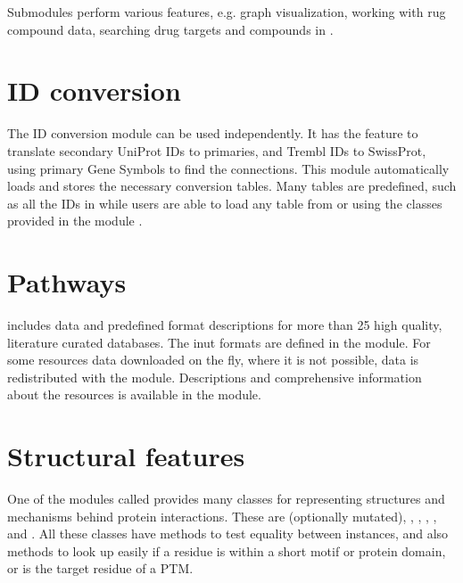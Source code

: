 \documentclass[letterpaper,10pt,english]{sphinxmanual}
\begin{document}
Submodules perform various features, e.g. graph visualization, working with
rug compound data, searching drug targets and compounds in .


\section{ID conversion}
\label{\detokenize{index:id-conversion}}
The ID conversion module  can be used independently. It has the
feature to translate secondary UniProt IDs to primaries, and Trembl IDs to
SwissProt, using primary Gene Symbols to find the connections. This module
automatically loads and stores the necessary conversion tables. Many tables
are predefined, such as all the IDs in  while
users are able to load any table from  or  using the classes
provided in the module .


\section{Pathways}
\label{\detokenize{index:pathways}}
 includes data and predefined format descriptions for more than 25
high quality, literature curated databases. The inut formats are defined in
the  module. For some resources data downloaded on the fly,
where it is not possible, data is redistributed with the module. Descriptions
and comprehensive information about the resources is available in the
 module.


\section{Structural features}
\label{\detokenize{index:structural-features}}
One of the modules called  provides many classes for representing
structures and mechanisms behind protein interactions. These are 
(optionally mutated), , , , ,
 and . All these classes have 
methods to test equality between instances, and also 
methods to look up easily if a residue is within a short motif or protein
domain, or is the target residue of a PTM.
\end{document}
